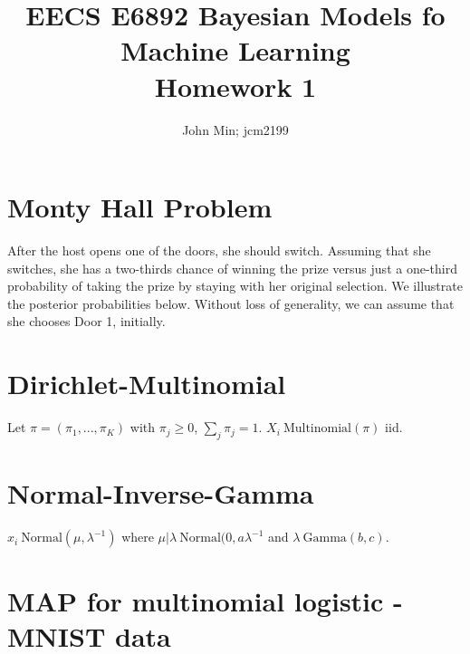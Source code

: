 \documentclass{article}
\title{EECS E6892 Bayesian Models fo Machine Learning\\ Homework 1}
\author{John Min; jcm2199}
\begin{document}
\maketitle
\section{Monty Hall Problem}

After the host opens one of the doors, she should switch.  Assuming that she switches, she has a two-thirds chance of winning the prize versus just a one-third probability of taking the prize by staying with her original selection.  We illustrate the posterior probabilities below.  Without loss of generality, we can assume that she chooses Door 1, initially.

\section{Dirichlet-Multinomial}

Let $\pi = (\pi_1, ..., \pi_K)$ with $\pi_j \geq 0$, $\sum_j \pi_j = 1$.  $X_i ~ \text{Multinomial} (\pi)$ iid.

\section{Normal-Inverse-Gamma}
$x_i ~ \text{Normal}(\mu, \lambda^{-1})$ where $\mu | \lambda ~ \text{Normal}(0, a \lambda^{-1}$ and $\lambda ~ \text{Gamma}(b,c)$.  


\section{MAP for multinomial logistic - MNIST data}
\end{document}
